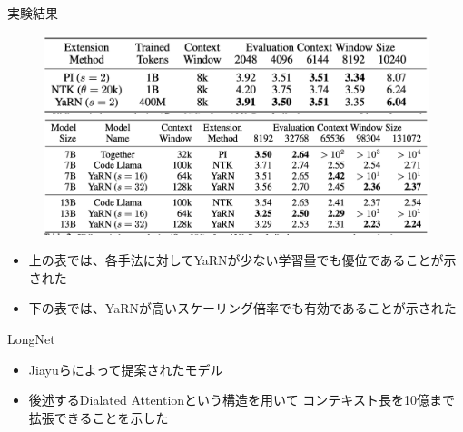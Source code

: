 \documentclass[dvipdfm, aspectratio=169]{beamer}
\begin{document}
    \begin{frame}{実験結果}
            \begin{figure}[ht]
                \begin{center}
                    \includegraphics[width=.6\hsize]{yarn1.png}
                    \includegraphics[width=.7\hsize]{yarn2.png}
                \end{center}
            \end{figure}

            \begin{itemize}
                \item 上の表では、各手法に対してYaRNが少ない学習量でも優位であることが示された
                \item 下の表では、YaRNが高いスケーリング倍率でも有効であることが示された
            \end{itemize}
    \end{frame}
    \begin{frame}{LongNet}
        \begin{itemize}
            \item Jiayuらによって提案されたモデル
            \item 後述するDialated Attentionという構造を用いて
            コンテキスト長を10億まで拡張できることを示した
        \end{itemize}
    \end{frame}
\end{document}
